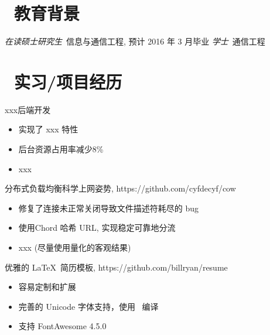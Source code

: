 \documentclass{resume}
\begin{document}


 
\section{\faGraduationCap\  教育背景}
\textit{在读硕士研究生}\ 信息与通信工程, 预计 2016 年 3 月毕业
\textit{学士}\ 通信工程

\section{\faUsers\ 实习/项目经历}
xxx后端开发
\begin{itemize}
  \item 实现了 xxx 特性
  \item 后台资源占用率减少8\%
  \item xxx
\end{itemize}

\begin{onehalfspacing}
分布式负载均衡科学上网姿势, https://github.com/cyfdecyf/cow
\begin{itemize}
  \item 修复了连接未正常关闭导致文件描述符耗尽的 bug
  \item 使用Chord 哈希 URL, 实现稳定可靠地分流
  \item xxx (尽量使用量化的客观结果)
\end{itemize}
\end{onehalfspacing}

\begin{onehalfspacing}
优雅的 \LaTeX\ 简历模板, https://github.com/billryan/resume
\begin{itemize}
  \item 容易定制和扩展
  \item 完善的 Unicode 字体支持，使用 \XeLaTeX\ 编译
  \item 支持 FontAwesome 4.5.0
\end{itemize}
\end{onehalfspacing}
\end{document}
